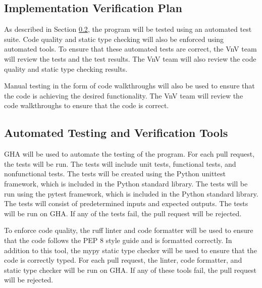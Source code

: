 \documentclass[12pt, titlepage]{article}
\begin{document}
\subsection{Implementation Verification Plan}

As described in Section \ref{sec:AutomatedTesting}, the \progname{} program will
be tested using an automated test suite. Code quality and static type checking
will also be enforced using automated tools. To ensure that these automated
tests are correct, the VnV team will review the tests and the test results. The
VnV team will also review the code quality and static type checking results.

Manual testing in the form of code walkthroughs will also be used to ensure that
the code is achieving the desired functionality. The VnV team will review the
code walkthroughs to ensure that the code is correct.




\subsection{Automated Testing and Verification Tools}
\label{sec:AutomatedTesting}

GHA will be used to automate the testing of the \progname{} program. For
each pull request, the tests will be run. The tests will include unit tests,
functional tests, and nonfunctional tests. The tests will be created using the
Python unittest framework, which is included in the Python standard library. The
tests will be run using the pytest framework, which is included in the Python
standard library. The tests will consist of predetermined inputs and expected
outputs. The tests will be run on GHA. If any of the tests fail, the
pull request will be rejected.

To enforce code quality, the ruff linter and code formatter will be used to
ensure that the code follows the PEP 8 style guide and is formatted correctly.
In addition to this tool, the mypy static type checker will be used to ensure
that the code is correctly typed. For each pull request, the linter, code
formatter, and static type checker will be run on GHA. If any of
these tools fail, the pull request will be rejected.
\end{document}
